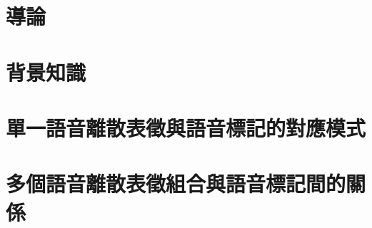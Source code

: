 \chapter{導論}



\chapter{背景知識}




\chapter{單一語音離散表徵與語音標記的對應模式}




\chapter{多個語音離散表徵組合與語音標記間的關係}




